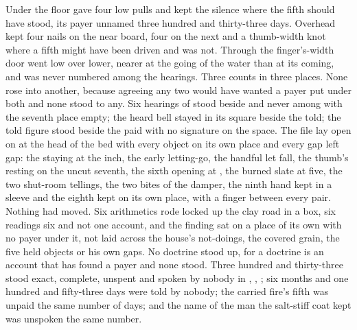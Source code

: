 Under the floor  gave four low pulls and kept the silence where the fifth should have stood, its payer unnamed three hundred and thirty-three days. Overhead  kept four nails on the near board, four on the next and a thumb-width knot where a fifth might have been driven and was not. Through the finger's-width door  went low over lower, nearer at the going of the water than at its coming, and was never numbered among the hearings. Three counts in three places. None rose into another, because agreeing any two would have wanted a payer put under both and none stood to any. Six hearings of  stood beside and never among with the seventh place empty; the heard bell stayed in its square beside the told; the told figure stood beside the paid with no signature on the space. The file lay open on  at the head of the bed with every object on its own place and every gap left gap: the staying at the inch, the early letting-go, the handful let fall, the thumb's resting on the uncut seventh, the sixth opening at , the burned slate at five, the two shut-room tellings, the two bites of the damper, the ninth hand kept in a sleeve and the eighth kept on its own place, with a finger between every pair. Nothing had moved. Six arithmetics rode locked up the clay road in a box, six readings six and not one account, and the finding sat on a place of its own with no payer under it, not laid across the house's not-doings, the covered grain, the five held objects or his own gaps. No doctrine stood up, for a doctrine is an account that has found a payer and none stood. Three hundred and thirty-three stood exact, complete, unspent and spoken by nobody in , , ; six months and one hundred and fifty-three days were told by nobody; the carried fire's fifth was unpaid the same number of days; and the name of the man the salt-stiff coat kept was unspoken the same number.

